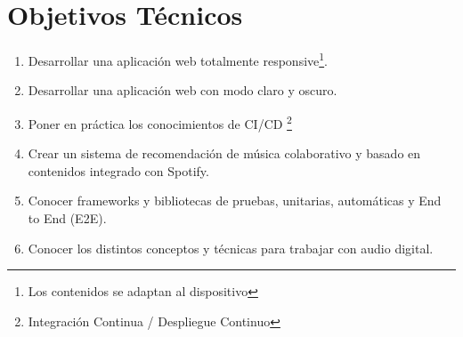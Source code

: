 \section{Objetivos Técnicos}
\begin{enumerate}
    \item 
        Desarrollar una aplicación web totalmente responsive\footnote{Los contenidos se adaptan al dispositivo}.
    \item
        Desarrollar una aplicación web con modo claro y oscuro.
    \item
        Poner en práctica los conocimientos de CI/CD \footnote{Integración Continua / Despliegue Continuo}
    \item
        Crear un sistema de recomendación de música colaborativo y basado en contenidos integrado con Spotify.
    \item
        Conocer frameworks y bibliotecas de pruebas, unitarias, automáticas y End to End (E2E).
    \item
        Conocer los distintos conceptos y técnicas para trabajar con audio digital.
\end{enumerate}